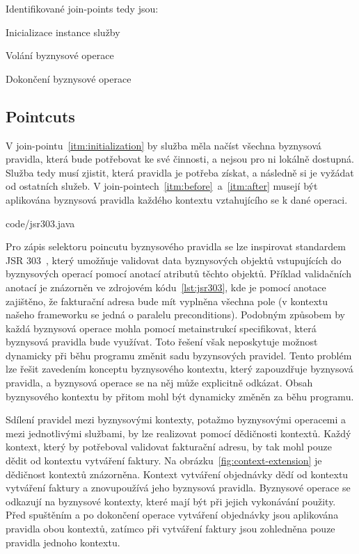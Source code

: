 Identifikované join-points tedy jsou:

\benum[label=\circledarabic]
\item\label{itm:initialization} Inicializace instance služby
\item\label{itm:before} Volání byznysové operace
\item\label{itm:after} Dokončení byznysové operace
\eenum

\subsection{Pointcuts}

V join-pointu~\ref{itm:initialization} by služba měla načíst všechna byznysová pravidla, která
bude potřebovat ke své činnosti, a nejsou pro ni lokálně dostupná. Služba tedy musí zjistit,
která pravidla je potřeba získat, a následně si je vyžádat od ostatních služeb.
V join-pointech~\ref{itm:before}~a~\ref{itm:after} musejí být aplikována byznysová pravidla každého
kontextu vztahujícího se k dané operaci.


{code/jsr303.java}

Pro zápis selektoru poincutu byznysového pravidla se lze inspirovat standardem \gls{JSR}
303~\cite{bernard2009jsr}, který umožňuje validovat data byznysových objektů vstupujících do
byznysových operací pomocí anotací atributů těchto objektů. Příklad validačních anotací je znázorněn
ve zdrojovém kódu~\ref{lst:jsr303}, kde je pomocí anotace  zajištěno, že fakturační
adresa bude mít vyplněna všechna pole (v kontextu našeho frameworku se jedná o paralelu preconditions).
Podobným způsobem by každá byznysová operace mohla pomocí metainstrukcí specifikovat, která byznysová
pravidla bude využívat. Toto řešení však neposkytuje možnost dynamicky při běhu programu změnit sadu
byzynsových pravidel. Tento problém lze řešit zavedením konceptu byznysového kontextu, který
zapouzdřuje byznysová pravidla, a byznysová operace se na něj může explicitně odkázat. Obsah byznysového
kontextu by přitom mohl být dynamicky změněn za běhu programu.

Sdílení pravidel mezi byznysovými kontexty, potažmo byznysovými operacemi a mezi jednotlivými službami,
by lze realizovat pomocí dědičnosti kontextů. Každý kontext, který by potřeboval validovat fakturační
adresu, by tak mohl pouze dědit od kontextu vytváření faktury. Na obrázku~\ref{fig:context-extension}
je dědičnost kontextů znázorněna. Kontext vytváření objednávky dědí od kontextu vytváření faktury
a znovupoužívá jeho byznysová pravidla. Byznysové operace se odkazují na byznysové kontexty, které mají
být při jejich vykonávání použity. Před spuštěním a po dokončení operace vytváření
objednávky jsou aplikována pravidla obou kontextů, zatímco při vytváření faktury jsou zohledněna
pouze pravidla jednoho kontextu.

